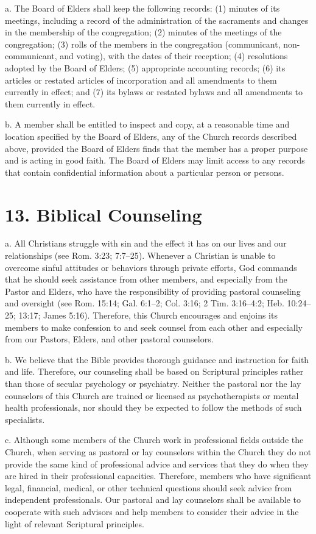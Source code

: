 \documentclass[
]{book}
\begin{document}
a. The Board of Elders shall keep the following records: (1) minutes of its meetings, including a record of the administration of the sacraments and changes in the membership of the congregation; (2) minutes of the meetings of the congregation; (3) rolls of the members in the congregation (communicant, non-communicant, and voting), with the dates of their reception; (4) resolutions adopted by the Board of Elders; (5) appropriate accounting records; (6) its articles or restated articles of incorporation and all amendments to them currently in effect; and (7) its bylaws or restated bylaws and all amendments to them currently in effect.

b. A member shall be entitled to inspect and copy, at a reasonable time and location specified by the Board of Elders, any of the Church records described above, provided the Board of Elders finds that the member has a proper purpose and is acting in good faith. The Board of Elders may limit access to any records that contain confidential information about a particular person or persons.

\hypertarget{biblical-counseling}{%
\section{13. Biblical Counseling}\label{biblical-counseling}}

a. All Christians struggle with sin and the effect it has on our lives and our relationships (see Rom. 3:23; 7:7--25). Whenever a Christian is unable to overcome sinful attitudes or behaviors through private efforts, God commands that he should seek assistance from other members, and especially from the Pastor and Elders, who have the responsibility of providing pastoral coun­sel­ing and oversight (see Rom. 15:14; Gal. 6:1--2; Col. 3:16; 2 Tim. 3:16--4:2; Heb. 10:24--25; 13:17; James 5:16). Therefore, this Church encourages and enjoins its members to make confession to and seek counsel from each other and especially from our Pastors, Elders, and other pastoral counselors.

b. We believe that the Bible provides thorough guidance and instruction for faith and life. Therefore, our counseling shall be based on Scriptural principles rather than those of secular psychology or psychiatry. Neither the pastoral nor the lay counselors of this Church are trained or licensed as psycho­therapists or mental health professionals, nor should they be expected to follow the methods of such specialists.

c. Although some members of the Church work in professional fields outside the Church, when serving as pastoral or lay counselors within the Church they do not provide the same kind of professional advice and services that they do when they are hired in their professional capacities. Therefore, members who have significant legal, financial, medical, or other technical questions should seek advice from independent professionals. Our pastoral and lay counselors shall be available to cooperate with such advisors and help members to consider their advice in the light of relevant Scriptural principles.
\end{document}
